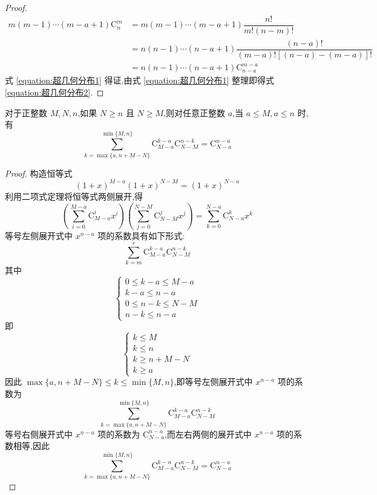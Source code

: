 \begin{proof}
    $$
    \begin{aligned}
        m(m-1) \cdots (m-a+1) \mathrm{C}_n^m &= m(m-1) \cdots (m-a+1) \dfrac{n!}{m! (n-m)!} \\
        &= n(n-1) \cdots (n-a+1) \dfrac{(n-a)!}{(m-a)! [(n-a) - (m-a)]!} \\
        &= n(n-1) \cdots (n-a+1) \mathrm{C}_{n-a}^{m-a}
    \end{aligned}
    $$
    式 \eqref{equation:超几何分布1} 得证.由式 \eqref{equation:超几何分布1} 整理即得式 \eqref{equation:超几何分布2}.
\end{proof}

\begin{lemma} \label{lemma:超几何分布2}
    \indent 对于正整数 $M,N,n$,如果 $N \geqslant n$ 且 $N \geqslant M$,则对任意正整数 $a$,当 $a \leqslant M, a \leqslant n$ 时,有
    \begin{equation} \label{equation:超几何分布3}
        \sum_{k=\max\{ a, n+M-N \}}^{\min\{ M,n \}} \mathrm{C}_{M-a}^{k-a} \mathrm{C}_{N-M}^{n-k} = \mathrm{C}_{N-a}^{n-a}
    \end{equation}
\end{lemma}

\begin{proof}
    构造恒等式
    $$
    (1+x)^{M-a} (1+x)^{N-M} = (1+x)^{N-a}
    $$
    利用二项式定理将恒等式两侧展开,得
    $$
    \left( \sum_{i=0}^{M-a} \mathrm{C}_{M-a}^i x^i \right) \left( \sum_{j=0}^{N-M} \mathrm{C}_{N-M}^j x^j \right) = \sum_{k=0}^{N-a} \mathrm{C}_{N-a}^k x^k
    $$
    等号左侧展开式中 $x^{n-a}$ 项的系数具有如下形式:
    $$
    \sum_{k=m}^{r} \mathrm{C}_{M-a}^{k-a} \mathrm{C}_{N-M}^{n-k}
    $$
    其中
    $$
    \begin{cases}
        0 \leqslant k-a \leqslant M-a \\[-5pt]
        k-a \leqslant n-a \\[-5pt]
        0 \leqslant n-k \leqslant N-M \\[-5pt]
        n-k \leqslant n-a
    \end{cases}
    $$
    即
    $$
    \begin{cases}
        k \leqslant M \\[-5pt]
        k \leqslant n \\[-5pt]
        k \geqslant n+M-N \\[-5pt]
        k \geqslant a
    \end{cases}
    $$
    因此 $\max\{ a, n+M-N \} \leqslant k \leqslant \min\{ M,n \}$,即等号左侧展开式中 $x^{n-a}$ 项的系数为
    $$
    \sum_{k=\max\{ a, n+M-N \}}^{\min\{ M,n \}} \mathrm{C}_{M-a}^{k-a} \mathrm{C}_{N-M}^{n-k}
    $$
    等号右侧展开式中 $x^{n-a}$ 项的系数为 $\mathrm{C}_{N-a}^{n-a}$,而左右两侧的展开式中 $x^{n-a}$ 项的系数相等,因此
    $$
    \sum_{k=\max\{ a, n+M-N \}}^{\min\{ M,n \}} \mathrm{C}_{M-a}^{k-a} \mathrm{C}_{N-M}^{n-k} = \mathrm{C}_{N-a}^{n-a}
    $$

    \vspace{-2em}
\end{proof}


